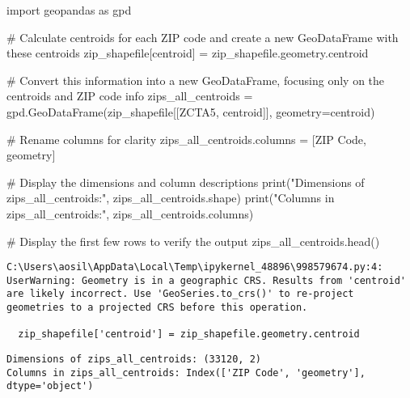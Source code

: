 \documentclass[
  letterpaper,
  DIV=11,
  numbers=noendperiod]{scrartcl}
\newenvironment{Shaded}{\begin{snugshade}}{\end{snugshade}}
\newcommand{\BuiltInTok}[1]{\textcolor[rgb]{0.00,0.23,0.31}{#1}}
\newcommand{\CommentTok}[1]{\textcolor[rgb]{0.37,0.37,0.37}{#1}}
\newcommand{\ImportTok}[1]{\textcolor[rgb]{0.00,0.46,0.62}{#1}}
\newcommand{\NormalTok}[1]{\textcolor[rgb]{0.00,0.23,0.31}{#1}}
\newcommand{\OperatorTok}[1]{\textcolor[rgb]{0.37,0.37,0.37}{#1}}
\newcommand{\StringTok}[1]{\textcolor[rgb]{0.13,0.47,0.30}{#1}}
\begin{document}
\begin{Shaded}
\begin{Highlighting}[]
\ImportTok{import}\NormalTok{ geopandas }\ImportTok{as}\NormalTok{ gpd}

\CommentTok{\# Calculate centroids for each ZIP code and create a new GeoDataFrame with these centroids}
\NormalTok{zip\_shapefile[}\StringTok{\textquotesingle{}centroid\textquotesingle{}}\NormalTok{] }\OperatorTok{=}\NormalTok{ zip\_shapefile.geometry.centroid  }

\CommentTok{\# Convert this information into a new GeoDataFrame, focusing only on the centroids and ZIP code info}
\NormalTok{zips\_all\_centroids }\OperatorTok{=}\NormalTok{ gpd.GeoDataFrame(zip\_shapefile[[}\StringTok{\textquotesingle{}ZCTA5\textquotesingle{}}\NormalTok{, }\StringTok{\textquotesingle{}centroid\textquotesingle{}}\NormalTok{]], geometry}\OperatorTok{=}\StringTok{\textquotesingle{}centroid\textquotesingle{}}\NormalTok{)}

\CommentTok{\# Rename columns for clarity}
\NormalTok{zips\_all\_centroids.columns }\OperatorTok{=}\NormalTok{ [}\StringTok{\textquotesingle{}ZIP Code\textquotesingle{}}\NormalTok{, }\StringTok{\textquotesingle{}geometry\textquotesingle{}}\NormalTok{]}

\CommentTok{\# Display the dimensions and column descriptions}
\BuiltInTok{print}\NormalTok{(}\StringTok{"Dimensions of zips\_all\_centroids:"}\NormalTok{, zips\_all\_centroids.shape)}
\BuiltInTok{print}\NormalTok{(}\StringTok{"Columns in zips\_all\_centroids:"}\NormalTok{, zips\_all\_centroids.columns)}

\CommentTok{\# Display the first few rows to verify the output}
\NormalTok{zips\_all\_centroids.head()}
\end{Highlighting}
\end{Shaded}

\begin{verbatim}
C:\Users\aosil\AppData\Local\Temp\ipykernel_48896\998579674.py:4: UserWarning: Geometry is in a geographic CRS. Results from 'centroid' are likely incorrect. Use 'GeoSeries.to_crs()' to re-project geometries to a projected CRS before this operation.

  zip_shapefile['centroid'] = zip_shapefile.geometry.centroid
\end{verbatim}

\begin{verbatim}
Dimensions of zips_all_centroids: (33120, 2)
Columns in zips_all_centroids: Index(['ZIP Code', 'geometry'], dtype='object')
\end{verbatim}
\end{document}
